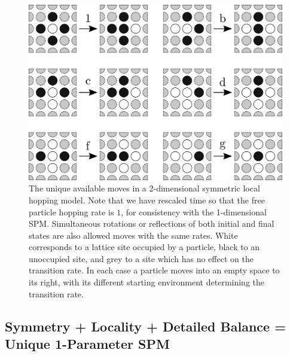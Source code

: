 \begin{figure}[h!]
 \caption[The possibe transitions which may occur in a symmetric local 2-dimensional hopping model.]{\label{fig:2dTransitions} 
 The unique available moves in a 2-dimensional symmetric local hopping model. Note that we have rescaled time so that the free particle hopping rate is $1$, for consistency with the 1-dimensional SPM.
 Simultaneous rotations or reflections of both initial and final states are also allowed moves with the same rates. White corresponds to a lattice site occupied by a particle, black to an unoccupied site, and grey to a site
 which has no effect on the transition rate. In each case a particle moves into an empty space to its right, with its different starting environment determining the transition rate.}
 \includegraphics[width=0.99\linewidth]{analytics/images/2dGenericRates}
\end{figure}


\subsection{Symmetry + Locality + Detailed Balance = Unique 1-Parameter SPM}

